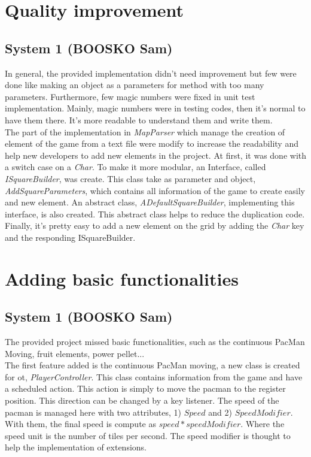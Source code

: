 \documentclass{article}
\begin{document}
\newpage

\section{Quality improvement}

\subsection{System 1 (BOOSKO Sam)}

In general, the provided implementation didn't need improvement but few were done like making an object as a parameters for method with too many parameters. Furthermore, few magic numbers were fixed in unit test implementation. Mainly, magic numbers were in testing codes, then it's normal to have them there. It's more readable to understand them and write them.\\

The part of the implementation in \textit{MapParser} which manage the creation of element of the game from a text file were modify to increase the readability and help new developers to add new elements in the project. At first, it was done with a switch case on a \textit{Char}. To make it more modular, an Interface, called \textit{ISquareBuilder}, was create. This class take as parameter and object, \textit{AddSquareParameters}, which contains all information of the game to create easily and new element. An abstract class, \textit{ADefaultSquareBuilder}, implementing this interface, is also created. This abstract class helps to reduce the duplication code. Finally, it's pretty easy to add a new element on the grid by adding the \textit{Char} key and the responding ISquareBuilder. \\

\section{Adding basic functionalities}

\subsection{System 1 (BOOSKO Sam)}

The provided project missed basic functionalities, such as the continuous PacMan Moving, fruit elements, power pellet...\\

The first feature added is the continuous PacMan moving, a new class is created for ot, \textit{PlayerController}. This class contains information from the game and have a scheduled action. This action is simply to move the pacman to the register position. This direction can be changed by a key listener. The speed of the pacman is managed here with two attributes, 1) $Speed$ and 2) $SpeedModifier$. With them, the final speed is compute as $speed * speedModifier$. Where the speed unit is the number of tiles per second. The speed modifier is thought to help the implementation of extensions.\\
\end{document}
